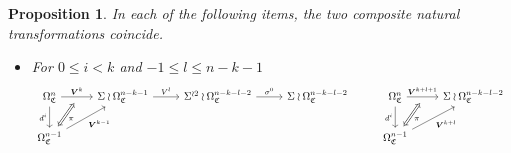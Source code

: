 \documentclass[a4paper,10pt
,draft
]{article}%
\numberwithin{equation}{section}
\numberwithin{figure}{section}
\newtheorem{proposition}[equation]{Proposition}%
\theoremstyle{definition} %
\newcommand{\1}{\ensuremath{\mathbbm 1}}%
\begin{document}
\begin{proposition}\label{CATDIAG2 PROP}
In each of the following items, the two composite natural transformations coincide.
\begin{itemize}
\item[(IT1)]
For $0 \leq i < k $ and $-1 \leq l \leq n-k-1$
\begin{equation}
\begin{tikzcd}[row sep = 20pt, column sep = 25pt]
	|[alias=V]|
	\Omega_{\mathfrak{C}}^{n} \ar{r}{\boldsymbol{V}^{k}}[swap,name=UU]{} \arrow{d}[swap]{d^i}&
	\Sigma \wr \Omega_{\mathfrak{C}}^{n-k-1} \ar{r}{V^l} &
	\Sigma^{\wr 2} \wr \Omega^{n-k-l-2}_{\mathfrak{C}} \ar{r}{\sigma^0} &
	\Sigma \wr \Omega^{n-k-l-2}_{\mathfrak{C}}
&
	\Omega^{n}_{\mathfrak{C}} \ar{r}{\boldsymbol{V}^{k+l+1}}[swap,name=UUU]{} \arrow{d}[swap]{d^i}&
	\Sigma \wr \Omega^{n-k-l-2}_{\mathfrak{C}} &
\\
	|[alias=VV]|
	\Omega^{n-1}_{\mathfrak{C}} \arrow{ur}[swap]{\boldsymbol{V}^{k-1}} & & &
&
	|[alias=VVV]|
	\Omega^{n-1}_{\mathfrak{C}} \arrow{ur}[swap]{\boldsymbol{V}^{k+l}} &
\arrow[Leftrightarrow, from=VV, to=UU,shorten >=0.05cm,shorten <=0.05cm
,swap,"\pi"
]
\arrow[Leftrightarrow, from=VVV, to=UUU,shorten >=0.05cm,shorten <=0.05cm
,swap,"\pi"
]
\end{tikzcd}
\end{equation}


\end{itemize}
\end{proposition}
\end{document}
